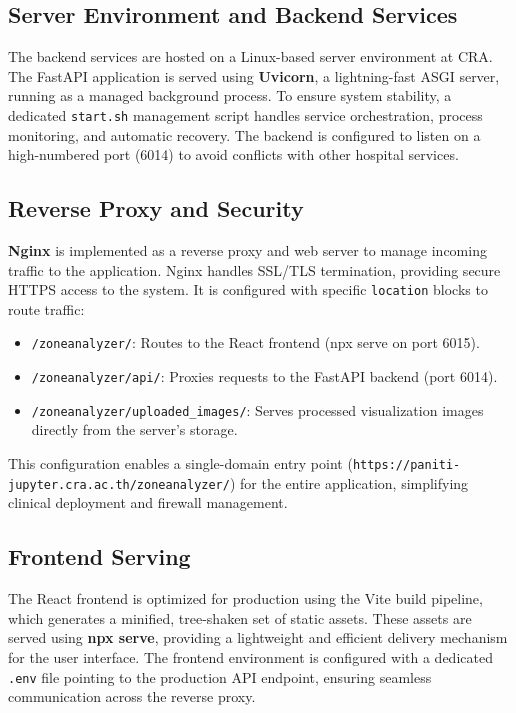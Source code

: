 \subsection{Server Environment and Backend Services}

The backend services are hosted on a Linux-based server environment at CRA. The FastAPI application is served using \textbf{Uvicorn}, a lightning-fast ASGI server, running as a managed background process. To ensure system stability, a dedicated \texttt{start.sh} management script handles service orchestration, process monitoring, and automatic recovery. The backend is configured to listen on a high-numbered port (6014) to avoid conflicts with other hospital services.

\subsection{Reverse Proxy and Security}

\textbf{Nginx} is implemented as a reverse proxy and web server to manage incoming traffic to the application. Nginx handles SSL/TLS termination, providing secure HTTPS access to the system. It is configured with specific \texttt{location} blocks to route traffic:
\begin{itemize}
    \item \texttt{/zoneanalyzer/}: Routes to the React frontend (npx serve on port 6015).
    \item \texttt{/zoneanalyzer/api/}: Proxies requests to the FastAPI backend (port 6014).
    \item \texttt{/zoneanalyzer/uploaded_images/}: Serves processed visualization images directly from the server's storage.
\end{itemize}
This configuration enables a single-domain entry point (\texttt{https://paniti-jupyter.cra.ac.th/zoneanalyzer/}) for the entire application, simplifying clinical deployment and firewall management.

\subsection{Frontend Serving}

The React frontend is optimized for production using the Vite build pipeline, which generates a minified, tree-shaken set of static assets. These assets are served using \textbf{npx serve}, providing a lightweight and efficient delivery mechanism for the user interface. The frontend environment is configured with a dedicated \texttt{.env} file pointing to the production API endpoint, ensuring seamless communication across the reverse proxy.


